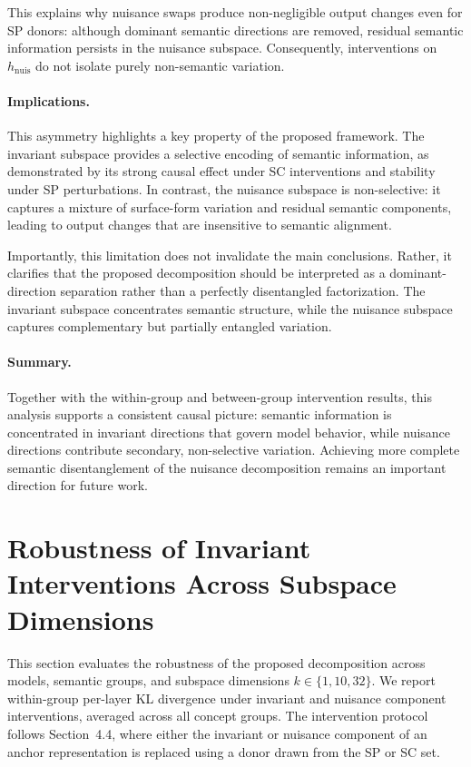 This explains why nuisance swaps produce non-negligible output changes even for SP donors: although dominant semantic directions are removed, residual semantic information persists in the nuisance subspace. Consequently, interventions on $h_{\mathrm{nuis}}$ do not isolate purely non-semantic variation.

\vspace{-0.8em}
\paragraph{Implications.}
This asymmetry highlights a key property of the proposed framework. The invariant subspace provides a selective encoding of semantic information, as demonstrated by its strong causal effect under SC interventions and stability under SP perturbations. In contrast, the nuisance subspace is non-selective: it captures a mixture of surface-form variation and residual semantic components, leading to output changes that are insensitive to semantic alignment.

Importantly, this limitation does not invalidate the main conclusions. Rather, it clarifies that the proposed decomposition should be interpreted as a dominant-direction separation rather than a perfectly disentangled factorization. The invariant subspace concentrates semantic structure, while the nuisance subspace captures complementary but partially entangled variation.

\vspace{-0.8em}
\paragraph{Summary.}
Together with the within-group and between-group intervention results, this analysis supports a consistent causal picture: semantic information is concentrated in invariant directions that govern model behavior, while nuisance directions contribute secondary, non-selective variation. Achieving more complete semantic disentanglement of the nuisance decomposition remains an important direction for future work.

\section{Robustness of Invariant Interventions Across Subspace Dimensions}
\label{app:all_groups}

This section evaluates the robustness of the proposed decomposition across models, semantic groups, and subspace dimensions $k \in \{1, 10, 32\}$. We report  within-group per-layer KL divergence under invariant and nuisance component interventions, averaged across all concept groups. The intervention protocol follows Section~4.4, where either the invariant or nuisance component of an anchor representation is replaced using a donor drawn from the SP or SC set.

